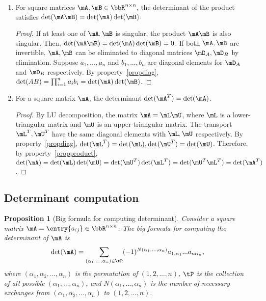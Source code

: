 \documentclass[11pt]{article}
\theoremstyle{plain}
\newtheorem{prop}{Proposition}
\theoremstyle{definition}
\begin{document}
\begin{enumerate}
	
	\item\label{propproduct} For square matrices $\mA, \mB \in \bbR^{n \times n}$, the determinant of the product satisfies $\det(\mA \mB) = \det(\mA) \det(\mB).$
	
	\begin{proof}
		If at least one of $\mA, \mB$ is singular, the product $\mA \mB$ is also singular. Then, $\det(\mA \mB) = \det(\mA) \det(\mB) = 0$. If both $\mA, \mB$ are invertible, $\mA, \mB$ can be eliminated to diagonal matrices $\mD_{A}, \mD_{B}$ by elimination. Suppose $a_1,...,a_n$ and $b_1,...,b_n$ are diagonal elements for $\mD_A$ and $\mD_B$ respectively. By property~\ref{propdiag}, $\det(AB) = \prod_{i=1}^n a_i b_i = \det(\mA) \det(\mB)$. 
	\end{proof}
	
	\item\label{proptrans} For a square matrix $\mA$, the determinant $\det(\mA^T) = \det(\mA)$. 
	
	\begin{proof}
		By LU decomposition, the matrix $\mA = \mL \mU$, where $\mL$ is a lower-triangular matrix and $\mU$ is an upper-triangular matrix. The transport $\mL^T ,\mU^T$ have the same diagonal elements with $\mL, \mU$ respectively. By property~\ref{propdiag}, $\det(\mL^T)= \det(\mL),  \det(\mU^T) = \det(\mU)$. Therefore, by property~\ref{propproduct}, $\det(\mA) = \det(\mL) \det(\mU) = \det(\mU^T) \det(\mL^T) = \det(\mU^T \mL^T) = \det(\mA^T)$. 
			\end{proof}
\end{enumerate}

\subsection{Determinant computation}
\begin{prop}[Big formula for computing determinant]
	Consider a square matrix $\mA = \entry{a_{ij}} \in \bbR^{n \times n}$. The big formula for computing the determinant of $\mA$ is
	\[ \det(\mA) =  \sum_{(\alpha_1,...,\alpha_n) \in \tP} (-1)^{N(\alpha_1,...,\alpha_n)} a_{1,\alpha_1} ... a_{n \alpha_n},  \]
	where $(\alpha_1, \alpha_2, ...,\alpha_n)$ is the permutation of $(1,2,...,n)$, $\tP$ is the collection of all possible  $(\alpha_1,...,\alpha_n)$, and $N(\alpha_1,...,\alpha_n)$ is the number of necessary exchanges from $(\alpha_1,\alpha_2,...,\alpha_n)$  to $(1,2,...,n)$. 
\end{prop}
\end{document}
